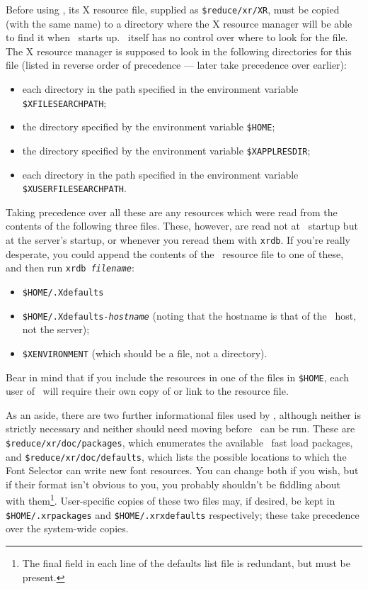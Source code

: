Before using \xr, its X resource file, supplied as
{\tt\$reduce/xr/XR}, must be copied (with the same name) to a
directory where the X resource manager will be able to find it when
\xr\ starts up.  \xr\ itself has no control over where to look for the
file.  The X resource manager is supposed to look in the following
directories for this file (listed in reverse order of precedence ---
later take precedence over earlier):

\begin{itemize}
\item each directory in the path specified in the environment variable
{\tt\$XFILESEARCHPATH};
\item the directory specified by the environment variable {\tt\$HOME};
\item the directory specified by the environment variable
{\tt\$XAPPLRESDIR};
\item each directory in the path specified in the environment variable
{\tt\$XUSERFILESEARCHPATH}.
\end{itemize}

Taking precedence over all these are any resources which were read
from the contents of the following three files.  These, however, are
read not at \xr\ startup but at the server's startup, or whenever you
reread them with {\tt xrdb}.  If you're really desperate, you could
append the contents of the \xr\ resource file to one of these, and
then run {\tt xrdb {\it filename\/}}:
\begin{itemize}
\item {\tt\$HOME/.Xdefaults}
\item {\tt\$HOME/.Xdefaults-{\it hostname\/}} (noting that the
hostname is that of the \xr\ host, not the server);
\item {\tt\$XENVIRONMENT} (which should be a file, not a directory).
\end{itemize}

Bear in mind that if you include the resources in one of the files in
{\tt\$HOME}, each user of \xr\ will require their own copy of or link
to the resource file.

As an aside, there are two further informational files used by \xr,
although neither is strictly necessary and neither should need
moving before \xr\ can be run.  These are
{\tt\$reduce/xr/doc/packages}, which enumerates the available
\REDUCE\ fast load packages, and {\tt\$reduce/xr/doc/defaults}, which
lists the possible locations to which the Font Selector can write new
font resources.  You can change both if you wish, but if their format
isn't obvious to you, you probably shouldn't be fiddling about with
them\footnote{The final field in each line of the defaults list file
is redundant, but must be present.}.  User-specific copies of these
two files may, if desired, be kept in {\tt\$HOME/.xrpackages} and
{\tt\$HOME/.xrxdefaults} respectively; these take precedence over the
system-wide copies.

